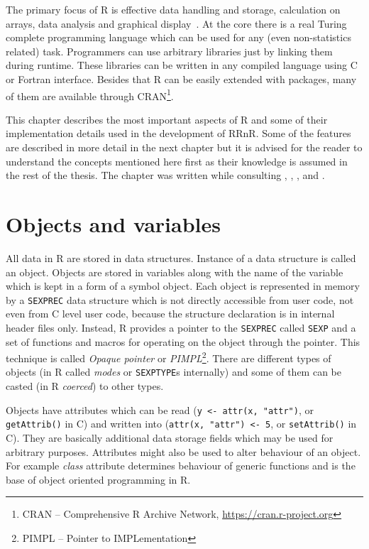 \documentclass[thesis=M,english,hidelinks]{FITthesis}[2012/10/20]
\begin{document}
The primary focus of R is effective data handling and storage, calculation on arrays, data analysis and graphical display~\cite{r_intro}. At the core there is a real Turing complete programming language which can be used for any (even non-statistics related) task. Programmers can use arbitrary libraries just by linking them during runtime. These libraries can be written in any compiled language using C or Fortran interface. Besides that R can be easily extended with packages, many of them are available through CRAN\footnote{CRAN -- Comprehensive R Archive Network, \url{https://cran.r-project.org}}.\par

This chapter describes the most important aspects of R and some of their implementation details used in the development of RRnR. Some of the features are described in more detail in the next chapter but it is advised for the reader to understand the concepts mentioned here first as their knowledge is assumed in the rest of the thesis. The chapter was written while consulting \cite{r_intro}, \cite{r_lang_def}, \cite{r_extensions}, \cite{adv_r} and \cite{r_internals}.\par
	
	\section{Objects and variables}
	All data in R are stored in data structures. Instance of a data structure is called an object. Objects are stored in variables along with the name of the variable which is kept in a form of a symbol object. Each object is represented in memory by a \lstinline|SEXPREC| data structure which is not directly accessible from user code, not even from C level user code, because the structure declaration is in internal header files only. Instead, R provides a pointer to the \lstinline|SEXPREC| called \lstinline|SEXP| and a set of functions and macros for operating on the object through the pointer. This technique is called \emph{Opaque pointer} or \emph{PIMPL}\footnote{PIMPL -- Pointer to IMPLementation}. There are different types of objects (in R called \emph{modes} or \lstinline|SEXPTYPE|s internally) and some of them can be casted (in R \emph{coerced}) to other types.\par
	
	Objects have attributes which can be read (\lstinline|y <- attr(x, "attr")|, or \lstinline|getAttrib()| in C) and written into (\lstinline|attr(x, "attr") <- 5|, or \lstinline|setAttrib()| in C). They are basically additional data storage fields which may be used for arbitrary purposes. Attributes might also be used to alter behaviour of an object. For example \emph{class} attribute determines behaviour of generic functions and is the base of object oriented programming in R.\par
	
\end{document}
